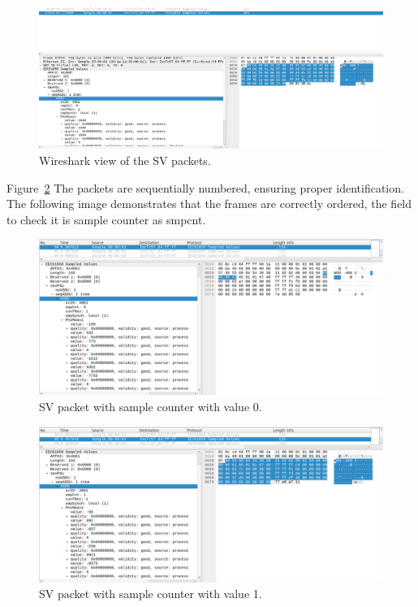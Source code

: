 \begin{figure}[tbh]
	\centering
	\includegraphics[width=1.00\textwidth, keepaspectratio]{ch6/assets/simple_sv.png} %
	\caption{Wireshark view of the SV packets.}
	\label{fig:simple_sv}
\end{figure}
\FloatBarrier

Figure~\ref{fig:sv_seq_1} The packets are sequentially numbered, ensuring proper identification. The following image demonstrates that the frames are correctly ordered, the field to check it is sample counter as smpcnt.

\begin{figure}[tbh]
	\centering
	\includegraphics[width=1.00\textwidth, keepaspectratio]{ch6/assets/sv_seq_1.png} %
	\caption{SV packet with sample counter with value 0.}
	\label{fig:sv_seq_1}
\end{figure}
\FloatBarrier

\begin{figure}[tbh]
	\centering
	\includegraphics[width=1.00\textwidth, keepaspectratio]{ch6/assets/sv_seq_2.png} %
	\caption{SV packet with sample counter with value 1.}
	\label{fig:sv_seq_2}
\end{figure}
\FloatBarrier

